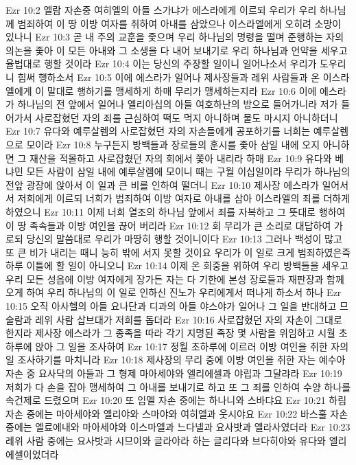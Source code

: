 Ezr 10:2  엘람 자손중 여히엘의 아들 스가냐가 에스라에게 이르되 우리가 우리 하나님께 범죄하여 이 땅 이방 여자를 취하여 아내를 삼았으나 이스라엘에게 오히려 소망이 있나니
Ezr 10:3  곧 내 주의 교훈을 좇으며 우리 하나님의 명령을 떨며 준행하는 자의 의논을 좇아 이 모든 아내와 그 소생을 다 내어 보내기로 우리 하나님과 언약을 세우고 율법대로 행할 것이라
Ezr 10:4  이는 당신의 주장할 일이니 일어나소서 우리가 도우리니 힘써 행하소서
Ezr 10:5  이에 에스라가 일어나 제사장들과 레위 사람들과 온 이스라엘에게 이 말대로 행하기를 맹세하게 하매 무리가 맹세하는지라
Ezr 10:6  이에 에스라가 하나님의 전 앞에서 일어나 엘리아십의 아들 여호하난의 방으로 들어가니라 저가 들어가서 사로잡혔던 자의 죄를 근심하여 떡도 먹지 아니하며 물도 마시지 아니하더니
Ezr 10:7  유다와 예루살렘의 사로잡혔던 자의 자손들에게 공포하기를 너희는 예루살렘으로 모이라
Ezr 10:8  누구든지 방백들과 장로들의 훈시를 좇아 삼일 내에 오지 아니하면 그 재산을 적몰하고 사로잡혔던 자의 회에서 쫓아 내리라 하매
Ezr 10:9  유다와 베냐민 모든 사람이 삼일 내에 예루살렘에 모이니 때는 구월 이십일이라 무리가 하나님의 전앞 광장에 앉아서 이 일과 큰 비를 인하여 떨더니
Ezr 10:10  제사장 에스라가 일어서서 저희에게 이르되 너희가 범죄하여 이방 여자로 아내를 삼아 이스라엘의 죄를 더하게 하였으니
Ezr 10:11  이제 너희 열조의 하나님 앞에서 죄를 자복하고 그 뜻대로 행하여 이 땅 족속들과 이방 여인을 끊어 버리라
Ezr 10:12  회 무리가 큰 소리로 대답하여 가로되 당신의 말씀대로 우리가 마땅히 행할 것이니이다
Ezr 10:13  그러나 백성이 많고 또 큰 비가 내리는 때니 능히 밖에 서지 못할 것이요 우리가 이 일로 크게 범죄하였은즉 하루 이틀에 할 일이 아니오니
Ezr 10:14  이제 온 회중을 위하여 우리 방백들을 세우고 우리 모든 성읍에 이방 여자에게 장가든 자는 다 기한에 본성 장로들과 재판장과 함께 오게 하여 우리 하나님의 이 일로 인하신 진노가 우리에게서 떠나게 하소서 하나
Ezr 10:15  오직 아사헬의 아들 요나단과 디과의 아들 야스야가 일어나 그 일을 반대하고 므술람과 레위 사람 삽브대가 저희를 돕더라
Ezr 10:16  사로잡혔던 자의 자손이 그대로 한지라 제사장 에스라가 그 종족을 따라 각기 지명된 족장 몇 사람을 위임하고 시월 초하루에 앉아 그 일을 조사하여
Ezr 10:17  정월 초하루에 이르러 이방 여인을 취한 자의 일 조사하기를 마치니라
Ezr 10:18  제사장의 무리 중에 이방 여인을 취한 자는 예수아 자손 중 요사닥의 아들과 그 형제 마아세야와 엘리에셀과 야립과 그달랴라
Ezr 10:19  저희가 다 손을 잡아 맹세하여 그 아내를 보내기로 하고 또 그 죄를 인하여 수양 하나를 속건제로 드렸으며
Ezr 10:20  또 임멜 자손 중에는 하나니와 스바댜요
Ezr 10:21  하림 자손 중에는 마아세야와 엘리야와 스마야와 여히엘과 웃시야요
Ezr 10:22  바스훌 자손 중에는 엘료에내와 마아세야와 이스마엘과 느다넬과 요사밧과 엘라사였더라
Ezr 10:23  레위 사람 중에는 요사밧과 시므이와 글라야라 하는 글리다와 브다히야와 유다와 엘리에셀이었더라
